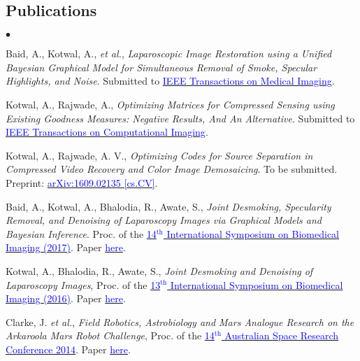 \documentclass[margin,line]{res}
\newenvironment{list2}{
  \begin{list}{$\bullet$}{%
      \setlength{\itemsep}{0in}
      \setlength{\parsep}{0in} \setlength{\parskip}{0in}
      \setlength{\topsep}{0in} \setlength{\partopsep}{0in} 
      \setlength{\leftmargin}{0.18in}}}{\end{list}}
\begin{document}
\begin{resume}

\section{\sc Publications}
\begin{list2}
\item Baid, A., Kotwal, A., {\em et al.}, {\em Laparoscopic Image Restoration using a Unified Bayesian Graphical Model for Simultaneous Removal of Smoke, Specular Highlights, and Noise}. Submitted to \href{http://ieee-tmi.org}{\textcolor{blue} {IEEE Transactions on Medical Imaging}}.
\item Kotwal, A., Rajwade, A., {\em Optimizing Matrices for Compressed Sensing using Existing Goodness Measures: Negative Results, And An Alternative}. Submitted to \href{http://ieeexplore.ieee.org/xpl/RecentIssue.jsp?reload=true&punumber=6745852}{\textcolor{blue} {IEEE Transactions on Computational Imaging}}.
\item Kotwal, A., Rajwade, A. V., {\em Optimizing Codes for Source Separation in Compressed Video Recovery and Color Image Demosaicing}. To be submitted. 
Preprint: \href{https://arxiv.org/abs/1609.02135}{\textcolor{blue} {arXiv:1609.02135 [cs.CV]}}.
\item Baid, A., Kotwal, A., Bhalodia, R., Awate, S., {\em Joint Desmoking, Specularity Removal, and Denoising of Laparoscopy Images via Graphical Models and Bayesian Inference}. Proc. of the \href{http://biomedicalimaging.org/2017/}{\textcolor{blue} {14$^\text{th}$ International Symposium on Biomedical Imaging (2017)}}. Paper \href{http://ieeexplore.ieee.org/document/7950623/?reload=true}{\textcolor{blue} {here}}.
\item Kotwal, A., Bhalodia, R., Awate, S., {\em Joint Desmoking and Denoising of Laparoscopy Images}, Proc. of the \href{http://biomedicalimaging.org/2016/}{\textcolor{blue} {13$^\text{th}$ International Symposium on Biomedical Imaging (2016)}}. Paper \href{http://ieeexplore.ieee.org/document/7493446/?reload=true}{\textcolor{blue} {here}}.
\item Clarke, J. {\em et al.}, {\em Field Robotics, Astrobiology and Mars Analogue Research on the Arkaroola Mars Robot Challenge}, Proc. of the \href{http://www.nssa.com.au/14asrc/14ASRC-proceedings.zip}{\textcolor{blue} {14$^\text{th}$ Australian Space Research Conference 2014}}. Paper \href{http://alankarkotwal.github.io/pubs/asrc14.pdf}{\textcolor{blue} {here}}.
\end{list2}


\end{resume}
\end{document}
